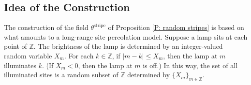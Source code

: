 \documentclass[12pt]{amsart}
\begin{document}
%	
	
\subsection{Idea of the Construction} The construction of the field $\theta^{\text{stripe}}$ of Proposition \ref{P: random stripes} is based on what amounts to a long-range site percolation model.  Suppose a lamp sits at each point of $\mathbb{Z}$.  The brightness of the lamp is determined by an integer-valued random variable $X_{m}$.  For each $k \in \mathbb{Z}$, if $|m - k| \leq X_{m}$, then the lamp at $m$ illuminates $k$.  (If $X_{m} < 0$, then the lamp at $m$ is off.)  In this way, the set of all illuminated sites is a random subset of $\mathbb{Z}$ determined by $\{X_{m}\}_{m \in \mathbb{Z}}$.  
\end{document}
